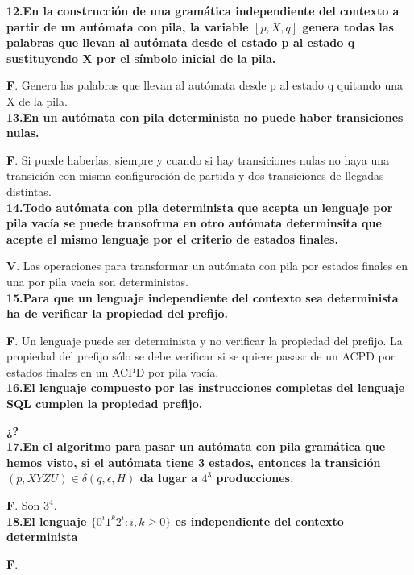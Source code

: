 \documentclass[a4paper,11pt]{article}
\begin{document}
\textbf{12.En la construcción de una gramática independiente del contexto a partir de un autómata con pila, la variable $[p,X,q]$ genera todas las palabras que llevan al autómata desde el estado p al estado q sustituyendo X por el símbolo inicial de la pila.}

\textbf{F}. Genera las palabras que llevan al autómata desde p al estado q quitando una X de la pila. \\

\textbf{13.En un autómata con pila determinista no puede haber transiciones nulas.}

\textbf{F}. Si puede haberlas, siempre y cuando si hay transiciones nulas no haya una transición con misma configuración de partida y dos transiciones de llegadas distintas. \\

\textbf{14.Todo autómata con pila determinista que acepta un lenguaje por pila vacía se puede transofrma en otro autómata determinsita que acepte el mismo lenguaje por el criterio de estados finales.}

\textbf{V}. Las operaciones para transformar un autómata con pila por estados finales en una por pila vacía son deterministas. \\

\textbf{15.Para que un lenguaje independiente del contexto sea determinista ha de verificar la propiedad del prefijo.}

\textbf{F}. Un lenguaje puede ser determinista y no verificar la propiedad del prefijo. La propiedad del prefijo sólo se debe verificar si se quiere pasasr de un ACPD por estados finales en un ACPD por pila vacía. \\

\textbf{16.El lenguaje compuesto por las instrucciones completas del lenguaje SQL cumplen la propiedad prefijo.}

\textbf{¿?} \\

\textbf{17.En el algoritmo para pasar un autómata con pila gramática que hemos visto, si el autómata tiene 3 estados, entonces la transición $(p,XYZU)\in \delta(q,\epsilon,H)$ da lugar a $4^3$ producciones.}

\textbf{F}. Son $3^4$. \\

\textbf{18.El lenguaje $\{0^i1^k2^i:i,k\geq 0\}$ es independiente del contexto determinista}

\textbf{F}. \\
\end{document}
